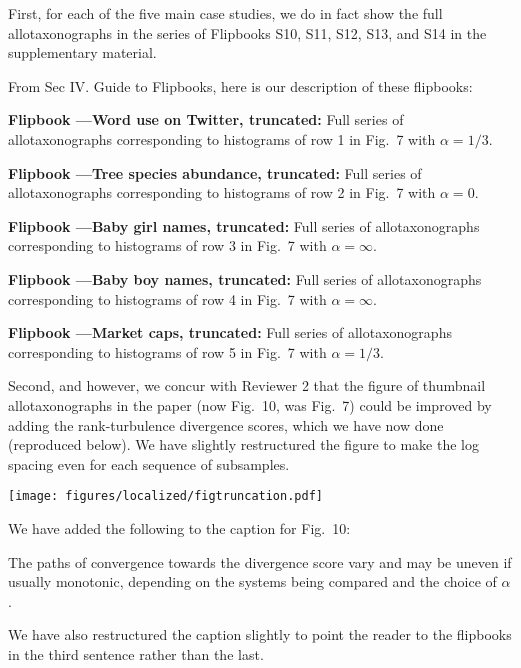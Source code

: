 First, for each of the five main case studies,
we do in fact show the full allotaxonographs in the series of
Flipbooks S10, S11, S12, S13, and S14 in the
supplementary material.

From Sec IV. Guide to Flipbooks,
here is our description of these flipbooks:
\begin{excerpt}
  \textbf{Flipbook \flipbooktwittertrunc---Word use on Twitter, truncated:}
  Full series of allotaxonographs 
  corresponding to histograms of
  row 1 in Fig.~7 with $\alpha=1/3$.

  \smallskip
  \textbf{Flipbook \flipbooktreestrunc---Tree species abundance, truncated:}
  Full series of allotaxonographs 
  corresponding to histograms of
  row 2 in Fig.~7 with $\alpha=0$.

  \smallskip
  \textbf{Flipbook \flipbookgirlnamestrunc---Baby girl names, truncated:}
  Full series of allotaxonographs 
  corresponding to histograms of
  row 3 in Fig.~7 with $\alpha=\infty$.

  \smallskip
  \textbf{Flipbook \flipbookboynamestrunc---Baby boy names, truncated:}
  Full series of allotaxonographs 
  corresponding to histograms of
  row 4 in Fig.~7 with $\alpha=\infty$.

  \smallskip
  \textbf{Flipbook \flipbookcompaniestrunc---Market caps, truncated:}
  Full series of allotaxonographs 
  corresponding to histograms of
  row 5 in Fig.~7 with $\alpha=1/3$.
\end{excerpt}

Second, and however, we concur with Reviewer 2 that the figure of thumbnail
allotaxonographs in the paper (now Fig.~10, was Fig.~7) could be improved by adding
the rank-turbulence divergence scores, which we have now done (reproduced below).
We have slightly restructured the figure to make the log spacing
even for each sequence of subsamples.

\texttt{[image: figures/localized/figtruncation.pdf]}

We have added the following to the caption for Fig.~10:
\begin{excerpt}
  The paths of convergence towards the divergence score
  vary and may be uneven if usually monotonic,
  depending on
  the systems being compared and the choice of $\alpha$.
\end{excerpt}

We have also restructured the caption slightly to point
the reader to the flipbooks in the third sentence rather than the last.

